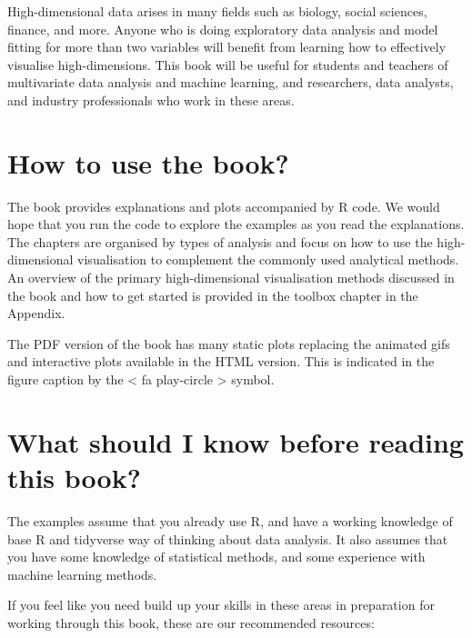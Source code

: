 \documentclass[
  letterpaper,
]{krantz}
\begin{document}

High-dimensional data arises in many fields such as biology, social
sciences, finance, and more. Anyone who is doing exploratory data
analysis and model fitting for more than two variables will benefit from
learning how to effectively visualise high-dimensions. This book will be
useful for students and teachers of multivariate data analysis and
machine learning, and researchers, data analysts, and industry
professionals who work in these areas.

\section*{How to use the book?}\label{how-to-use-the-book}


The book provides explanations and plots accompanied by R code. We would
hope that you run the code to explore the examples as you read the
explanations. The chapters are organised by types of analysis and focus
on how to use the high-dimensional visualisation to complement the
commonly used analytical methods. An overview of the primary
high-dimensional visualisation methods discussed in the book and how to
get started is provided in the toolbox chapter in the Appendix.

The PDF version of the book has many static plots replacing the animated
gifs and interactive plots available in the HTML version. This is
indicated in the figure caption by the {{< fa play-circle >}} symbol.

\section*{What should I know before reading this
book?}\label{what-should-i-know-before-reading-this-book}


The examples assume that you already use R, and have a working knowledge
of base R and tidyverse way of thinking about data analysis. It also
assumes that you have some knowledge of statistical methods, and some
experience with machine learning methods.

If you feel like you need build up your skills in these areas in
preparation for working through this book, these are our recommended
resources:
\end{document}
